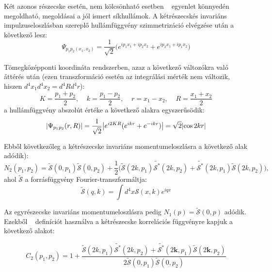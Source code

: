 \documentclass[11pt,a4paper]{article}
\numberwithin{equation}{subsection}
\numberwithin{figure}{section}
\begin{document}
Két azonos részecske esetén, nem kölcsönható esetben ~ egyenlet könnyedén megoldható, megoldásai a jól
ismert síkhullámok. A kétrészecskés invariáns impulzuseloszlásban szereplő hullámfüggvény szimmetrizáció
elvégzése után a következő lesz:
\begin{equation}
\Psi_{{p_1}{p_2}({x_1},{x_2})} = \frac{1}{\sqrt{2}}\big({e^{{ip_1x_1}+i{p_2x_2}}+e^{i{p_2x_1}+i{p_1x_2}}}\big)
\end{equation}

Tömegközépponti koordináta rendszerben, azaz a következő változókra való áttérés után (ezen transzformáció esetén az integrálási mérték nem változik, hiszen $d^4x_1d^4x_2=d^4Rd^4r$):
\begin{equation}
{K}=\frac{p_1+p_2}{2},\;\;\;\;{k}=\frac{{p_1-p_2}}{2},\;\;\;\;{r}={x_1-x_2},\;\;\;\;{R}=\frac{{x_1+x_2}}{2}
\label{eq:CMF}
\end{equation}
\noindent
a hullámfüggvény abszolút értéke a következő alakra egyszerűsödik:
\begin{equation}
\abs{\Psi_{{p_1}{p_2}}({r},{R})} = \frac{1}{\sqrt{2}}\abs{e^{i{2KR}}(e^{i{kr}}+e^{-i{kr}})}=\sqrt{2}\abs{\cos{2{kr}}}
\end{equation}

Ebből következőleg a kétrészecske invariáns momentumeloszlásra a következő alak adódik):
\begin{equation}
N_2({p_1},{p_2})=\tilde{\mathcal{S}}(0, {p_1})\tilde{\mathcal{S}}(0, {p_2})+\frac{1}{2}\big(\tilde{\mathcal{S}}(2{k}, {p_1})\tilde{\mathcal{S^*}}(2{k}, {p_2})+\tilde{\mathcal{S^*}}(2{k},{ p_1})\tilde{\mathcal{S}}(2{k}, {p_2})\big),
\end{equation}
\noindent
ahol $\tilde{\mathcal{S}}$ a forrásfüggvény Fourier-transzformáltja:
\begin{equation}
\tilde{\mathcal{S}}({q}, {k})=\int d^4x\mathcal{S}(x,k)e^{i{qx}}
\end{equation}

Az egyrészecske invariáns momentumeloszlásra pedig $N_1({p})=\tilde{\mathcal{S}}(0, {p})$ adódik. Ezekből ~ definíciót használva a kétrészecske korrelációs függvényre kapjuk a következő alakot:

\begin{equation}
C_2({p_1},{p_2}) = 1+ \frac{\tilde{\mathcal{S}}(2{k}, {p_1})\tilde{\mathcal{S^*}}(2{k}, {p_2})+\tilde{\mathcal{S^*}}(2\bm{k},{ p_1})\tilde{\mathcal{S}}(2\bm{k}, {p_2})}{2\tilde{\mathcal{S}}(0, {p_1})\tilde{\mathcal{S}}(0, {p_2})}
\end{equation}
\end{document}
